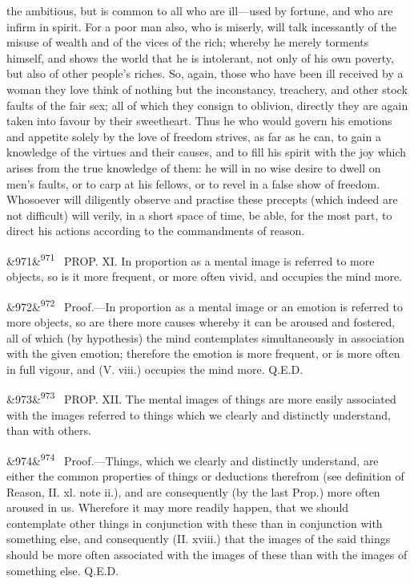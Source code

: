 \documentclass[12pt]{article}
\newcommand{\para}[1][]{\par\noindent\ifx&#1&\else\textsuperscript{\footnotesize #1}~\fi}
\begin{document}
the ambitious, but is common to all who are ill---used by fortune, and who are infirm in spirit. For a poor man also, who is miserly, will talk incessantly of the misuse of wealth and of the vices of the rich; whereby he merely torments himself, and shows the world that he is intolerant, not only of his own poverty, but also of other people's riches. So, again, those who have been ill received by a woman they love think of nothing but the inconstancy, treachery, and other stock faults of the fair sex; all of which they consign to oblivion, directly they are again taken into favour by their sweetheart. Thus he who would govern his emotions and appetite solely by the love of freedom strives, as far as he can, to gain a knowledge of the virtues and their causes, and to fill his spirit with the joy which arises from the true knowledge of them: he will in no wise desire to dwell on men's faults, or to carp at his fellows, or to revel in a false show of freedom. Whosoever will diligently observe and practise these precepts (which indeed are not difficult) will verily, in a short space of time, be able, for the most part, to direct his actions according to the commandments of reason.

\para[971] PROP. XI. In proportion as a mental image is referred to more objects, so is it more frequent, or more often vivid, and occupies the mind more.

\para[972] Proof.---In proportion as a mental image or an emotion is referred to more objects, so are there more causes whereby it can be aroused and fostered, all of which (by hypothesis) the mind contemplates simultaneously in association with the given emotion; therefore the emotion is more frequent, or is more often in full vigour, and (V. viii.) occupies the mind more. Q.E.D.

\para[973] PROP. XII. The mental images of things are more easily associated with the images referred to things which we clearly and distinctly understand, than with others.

\para[974] Proof.---Things, which we clearly and distinctly understand, are either the common properties of things or deductions therefrom (see definition of Reason, II. xl. note ii.), and are consequently (by the last Prop.) more often aroused in us. Wherefore it may more readily happen, that we should contemplate other things in conjunction with these than in conjunction with something else, and consequently (II. xviii.) that the images of the said things should be more often associated with the images of these than with the images of something else. Q.E.D.
\end{document}
